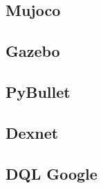 

    \subsection{Mujoco}
    \subsection{Gazebo}
    \subsection{PyBullet}

    \subsection{Dexnet}
    \subsection{DQL Google}
